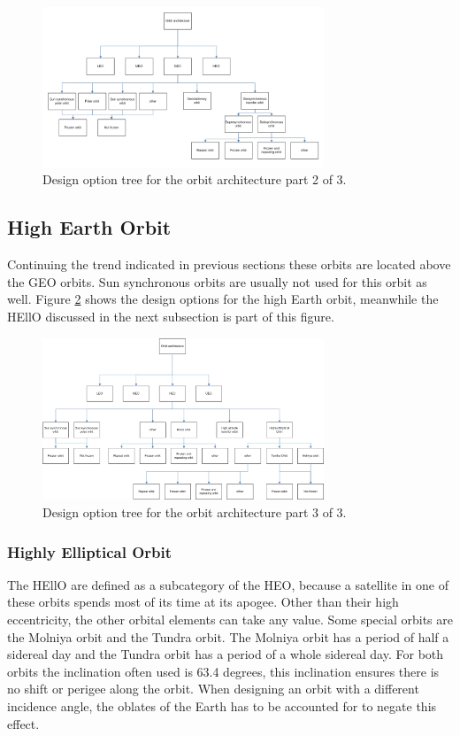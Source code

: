 \begin{figure}
\centering
  \includegraphics[width=0.75\textwidth,angle=0]{chapters/img/blDOOrb2.jpg}
	\caption{Design option tree for the orbit architecture part 2 of 3.}
	\label{DOOrb2}
\end{figure}

\subsection{High Earth Orbit}
\label{sec:blOrb4}
Continuing the trend indicated in previous sections these orbits are located above the \acs{GEO} orbits. Sun synchronous orbits are usually not used for this orbit as well. 
Figure \ref{DOOrb3} shows the design options for the high Earth orbit, meanwhile the \acs{HEllO} discussed in the next subsection is part of this figure.

\begin{figure}
\centering
  \includegraphics[width=0.75\textwidth,angle=0]{chapters/img/blDOOrb3.jpg}
	\caption{Design option tree for the orbit architecture part 3 of 3.}
	\label{DOOrb3}
\end{figure}

\subsubsection{Highly Elliptical Orbit}
\label{sec:blOrb4.5}
The \ac{HEllO} are defined as a subcategory of the \acs{HEO}, because a satellite in one of these orbits spends most of its time at its apogee. Other than their high eccentricity, the other orbital elements can take any value. Some special orbits are the Molniya orbit and the Tundra orbit. The Molniya orbit has a period of half a sidereal day and the Tundra orbit has a period of a whole sidereal day. For both orbits the inclination often used is 63.4 degrees, this inclination ensures there is no shift or perigee along the orbit. When designing an orbit with a different incidence angle, the oblates of the Earth has to be accounted for to negate this effect.